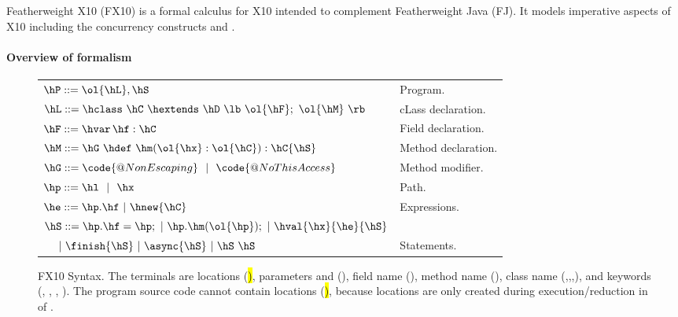 Featherweight X10 (FX10) is a formal calculus for X10 intended to  complement Featherweight Java
(FJ).  It models imperative aspects of X10 including the concurrency
constructs \hfinish{} and \hasync{}.


\paragraph{Overview of formalism}

\begin{figure}[htpb!]
\begin{center}
\begin{tabular}{|l|l|}
\hline

$\hP ::= \ol{\hL},\hS$ & Program. \\

$\hL ::= \hclass ~ \hC~\hextends~\hD~\lb~\ol{\hF};~\ol{\hM}~\rb$
& cLass declaration. \\

$\hF ::= \hvar\,\hf:\hC$
& Field declaration. \\

$\hM ::= \hG\ \hdef\ \hm(\ol{\hx}:\ol{\hC}):\hC\{\hS\}$
& Method declaration. \\

$\hG ::= \code{@NonEscaping} ~~|~~ \code{@NoThisAccess}$
& Method modifier. \\

$\hp ::= \hl ~~|~~ \hx$
& Path. \\ %

$\he ::=  \hp.\hf  ~|~ \hnew{\hC}$
& Expressions. \\ %

$\hS ::=  \hp.\hf = \hp; ~|~ \hp.\hm(\ol{\hp});  ~|~ \hval{\hx}{\he}{\hS}$ &\\
$~~~~|~ \finish{\hS}~|~ \async{\hS} ~|~ \hS~\hS$
& Statements. \\ %

\hline
\end{tabular}
\end{center}
\caption{FX10 Syntax.
    The terminals are locations (\hl), parameters and \hthis (\hx), field name (\hf), method name (\hm), class name (\hB,\hC,\hD,\hObject),
        and keywords (\hhnew, \hfinish, \hasync, ).
    The program source code cannot contain locations (\hl), because locations are only created during execution/reduction in  of .
    }
\label{Figure:syntax}
\end{figure}

